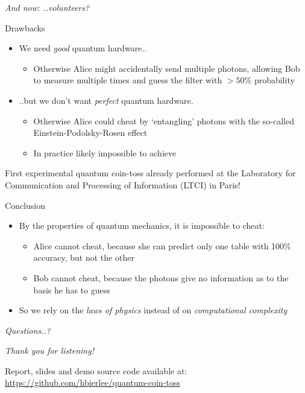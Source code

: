 \documentclass{beamer}
\begin{document}
\begin{frame}[plain,c]
    \begin{center}
        \Huge \emph{And now: ..volunteers?}
    \end{center}
\end{frame}


\begin{frame}{Drawbacks}
\begin{itemize}
    \item We need \emph{good} quantum hardware..
        \begin{itemize}
            \item Otherwise Alice might accidentally send multiple photons, allowing Bob to measure multiple times and guess the filter with $>50\%$ probability
        \end{itemize}
    \item ..but we don't want \emph{perfect} quantum hardware.
        \begin{itemize}
            \item Otherwise Alice could cheat by `entangling' photons with the so-called Einstein-Podolsky-Rosen effect
            \item In practice likely impossible to achieve
        \end{itemize}
\end{itemize}
First experimental quantum coin-toss already performed at the Laboratory for Communication and Processing of Information (LTCI) in Paris!
\end{frame}


\begin{frame}{Conclusion}
\begin{itemize}
    \item By the properties of quantum mechanics, it is impossible to cheat:
    \begin{itemize}
        \item Alice cannot cheat, because she can predict only one table with 100\% accuracy, but not the other
        \item Bob cannot cheat, because the photons give no information as to the basis he has to guess
    \end{itemize}
    \vfill
    \item So we rely on the \emph{laws of physics} instead of on \emph{computational complexity}
    \vfill
\end{itemize}
\end{frame}

\begin{frame}[plain,c]

\begin{center}
    \Huge \emph{Questions..?}
\end{center}

\end{frame}


\begin{frame}[plain,c]

\begin{center}
    \Huge \emph{Thank you for listening!}

\end{center}
\vfill
    \large
    Report, slides and demo source code available at:\\ \quad \url{https://github.com/hbierlee/quantum-coin-toss}

\end{frame}
\end{document}
